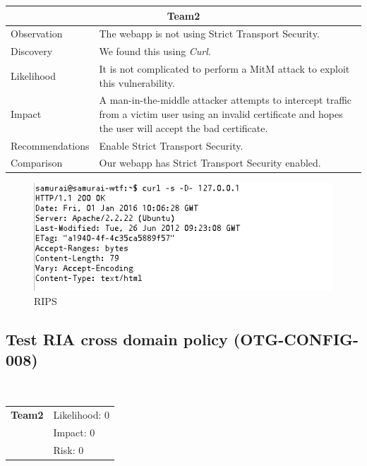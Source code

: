 \documentclass[headsepline,footsepline,footinclude=false,oneside,fontsize=11pt,paper=a4,listof=totoc,bibliography=totoc]{scrbook} %
\begin{document}
\begin{tabular}{ l|p{11cm}  }
	\hline
	\multicolumn{2}{c}{\textbf{Team2}} \\
	\hline
	Observation   &  The webapp is not using Strict Transport Security.  \\
	Discovery  &  We found this using \textit{Curl}.\\
	
	Likelihood & It is not complicated to perform a MitM attack to exploit this vulnerability. \\
	Impact    & A man-in-the-middle attacker attempts to intercept traffic from a victim user using an invalid certificate and hopes the user will accept the bad certificate. \\
	Recommendations & Enable Strict Transport Security. \\
	Comparison & Our webapp has Strict Transport Security enabled. \\
	\hline
\end{tabular}
 \begin{figure}[H]
 	\centering
 	\includegraphics[width=150mm]{logos/rsts.jpg}
 	\caption{RIPS \label{overflow}}
 \end{figure} 
\pagebreak
\subsection{Test RIA cross domain policy (OTG-CONFIG-008)}\
\begin{tabular}{cR{12cm}}
	\textbf{Team2} & Likelihood: 0\\& Impact: 0\\& Risk: 0
\end{tabular}
\end{document}
